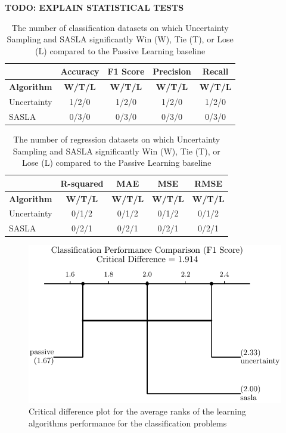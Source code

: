 \documentclass[conference]{IEEEtran}
\begin{document}
	\textbf{TODO: EXPLAIN STATISTICAL TESTS}
	\begin{table}[htbp]
		\centering
		\caption{The number of classification datasets on which Uncertainty Sampling and SASLA significantly Win (W), Tie (T), or Lose (L) compared to the Passive Learning baseline}
		\label{tab:classification_wtl}
		\begin{tabular}{lcccc}
			\hline
			& \textbf{Accuracy} & \textbf{F1 Score} & \textbf{Precision} & \textbf{Recall} \\
			\hline
			\textbf{Algorithm} & \textbf{W/T/L} & \textbf{W/T/L} &\textbf{W/T/L} & \textbf{W/T/L} \\
			\hline
			Uncertainty & 1/2/0 & 1/2/0 & 1/2/0 & 1/2/0 \\
			SASLA       & 0/3/0 & 0/3/0 & 0/3/0 & 0/3/0 \\
			\hline
		\end{tabular}
	\end{table}
	
	
	\begin{table}[htbp]
		\centering
		\caption{The number of regression datasets on which Uncertainty Sampling and SASLA significantly Win (W), Tie (T), or Lose (L) compared to the Passive Learning baseline}
		\label{tab:regression_wtl}
		\begin{tabular}{lcccc}
			\hline
			& \textbf{R-squared} & \textbf{MAE} & \textbf{MSE} & \textbf{RMSE} \\
			\hline
			\textbf{Algorithm} & \textbf{W/T/L} & \textbf{W/T/L} &\textbf{W/T/L} & \textbf{W/T/L} \\
			\hline
			Uncertainty & 0/1/2 & 0/1/2 & 0/1/2 & 0/1/2 \\
			SASLA       & 0/2/1 & 0/2/1 & 0/2/1 & 0/2/1 \\
			\hline
		\end{tabular}
	\end{table}
	
	\begin{figure}[htbp]
		\centering
		\includegraphics[width=\linewidth]{plots/classification_critical_difference.pdf}
		\caption{Critical difference plot for the average ranks of the learning algorithms performance for the classification problems}
		\label{fig:classification_cd}
	\end{figure}
	
\end{document}
